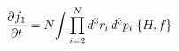 \documentclass[preview]{standalone}
\begin{document}
\begin{align*}
\special{dvisvgm:raw <g id='unique000'>}\pdv{f_1}{t}=N\!\int\prod_{i=2}^{N}d^3r_i\,d^3p_i\;\pb{H}{f}\special{dvisvgm:raw </g>}
\end{align*}
\end{document}
